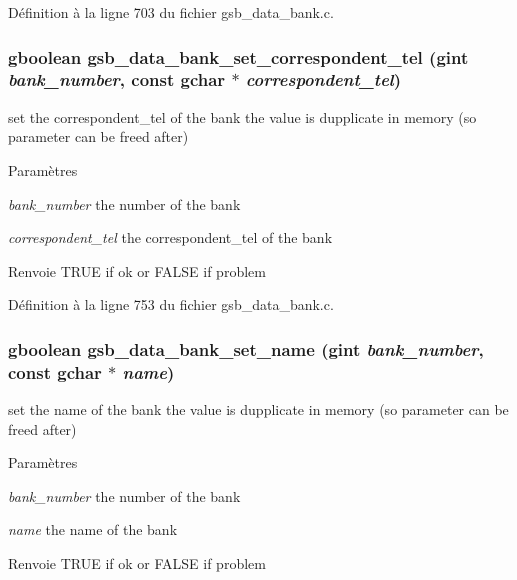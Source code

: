 Définition à la ligne 703 du fichier gsb\_\-data\_\-bank.c.

\subsubsection[{gsb\_\-data\_\-bank\_\-set\_\-correspondent\_\-tel}]{\setlength{\rightskip}{0pt plus 5cm}gboolean gsb\_\-data\_\-bank\_\-set\_\-correspondent\_\-tel (gint {\em bank\_\-number}, \/  const gchar $\ast$ {\em correspondent\_\-tel})}\label{gsb__data__bank_8c_a7f0eba26423ae9bc1625dec9965ade92}
set the correspondent\_\-tel of the bank the value is dupplicate in memory (so parameter can be freed after)


\begin{DoxyParams}{Paramètres}
\item[{\em bank\_\-number}]the number of the bank \item[{\em correspondent\_\-tel}]the correspondent\_\-tel of the bank\end{DoxyParams}
\begin{DoxyReturn}{Renvoie}
TRUE if ok or FALSE if problem 
\end{DoxyReturn}


Définition à la ligne 753 du fichier gsb\_\-data\_\-bank.c.

\subsubsection[{gsb\_\-data\_\-bank\_\-set\_\-name}]{\setlength{\rightskip}{0pt plus 5cm}gboolean gsb\_\-data\_\-bank\_\-set\_\-name (gint {\em bank\_\-number}, \/  const gchar $\ast$ {\em name})}\label{gsb__data__bank_8c_a0dff2c8d08fece8baf5ccba732d688c4}
set the name of the bank the value is dupplicate in memory (so parameter can be freed after)


\begin{DoxyParams}{Paramètres}
\item[{\em bank\_\-number}]the number of the bank \item[{\em name}]the name of the bank\end{DoxyParams}
\begin{DoxyReturn}{Renvoie}
TRUE if ok or FALSE if problem 
\end{DoxyReturn}


